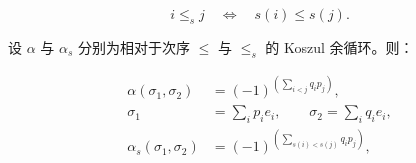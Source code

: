 \begin{equation}
  i\leq_s j\quad\Longleftrightarrow\quad s(i)\leq s(j).
  \tag{1.6.5.1}
\end{equation}

设 $\alpha$ 与 $\alpha_s$ 分别为相对于次序 $\leq$ 与 $\leq_s$ 的 Koszul
余循环。则：

\begin{equation}
  \begin{aligned}
    \alpha(\sigma_1,\sigma_2)
      &=(-1)^{\left(\sum_{i<j}q_i p_j\right)},\\
    \sigma_1&=\sum_i p_i e_i,
      \qquad \sigma_2=\sum_i q_i e_i,\\
    \alpha_s(\sigma_1,\sigma_2)
      &=(-1)^{\left(\sum_{s(i)<s(j)}q_i p_j\right)},
  \end{aligned}
  \tag{1.6.5.2}
\end{equation}
